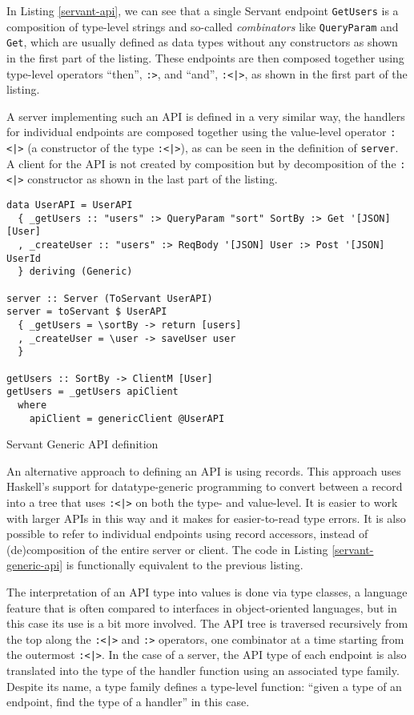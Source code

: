 \documentclass[english,odsaz]{fitthesis}
\begin{document}
In Listing \ref{servant-api}, we can see that a single Servant endpoint \texttt{GetUsers} is a
composition of type-level strings and so-called \emph{combinators} like \texttt{QueryParam} and
\texttt{Get}, which are usually defined as data types without any constructors as shown
in the first part of the listing. These endpoints are then composed together
using type-level operators ``then'', \texttt{:>}, and ``and'', \texttt{:<|>}, as shown in the first part
of the listing.

A server implementing such an API is defined in a very similar way, the handlers
for individual endpoints are composed together using the value-level operator
\texttt{:<|>} (a constructor of the type \texttt{:<|>}), as can be seen in the definition of
\texttt{server}. A client for the API is not created by composition but by decomposition
of the \texttt{:<|>} constructor as shown in the last part of the listing.

\begin{listing}[htbp]
\begin{verbatim}
data UserAPI = UserAPI
  { _getUsers :: "users" :> QueryParam "sort" SortBy :> Get '[JSON] [User]
  , _createUser :: "users" :> ReqBody '[JSON] User :> Post '[JSON] UserId
  } deriving (Generic)

server :: Server (ToServant UserAPI)
server = toServant $ UserAPI
  { _getUsers = \sortBy -> return [users]
  , _createUser = \user -> saveUser user
  }

getUsers :: SortBy -> ClientM [User]
getUsers = _getUsers apiClient
  where
    apiClient = genericClient @UserAPI
\end{verbatim}
\caption{Servant Generic API definition \label{servant-generic-api}}
\end{listing}

An alternative approach to defining an API is using records. This approach uses
Haskell's support for datatype-generic programming to convert between a record
into a tree that uses \texttt{:<|>} on both the type- and value-level. It is easier to
work with larger APIs in this way and it makes for easier-to-read type
errors. It is also possible to refer to individual endpoints using record
accessors, instead of (de)composition of the entire server or client. The code
in Listing \ref{servant-generic-api} is functionally equivalent to the previous listing.

The interpretation of an API type into values is done via type classes, a
language feature that is often compared to interfaces in object-oriented
languages, but in this case its use is a bit more involved. The API tree is
traversed recursively from the top along the \texttt{:<|>} and \texttt{:>} operators, one
combinator at a time starting from the outermost \texttt{:<|>}. In the case of a server,
the API type of each endpoint is also translated into the type of the handler
function using an associated type family. Despite its name, a type family
defines a type-level function: ``given a type of an endpoint, find the type of a
handler'' in this case.
\end{document}
